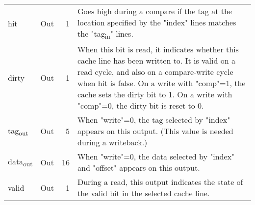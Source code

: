 \documentclass[11pt]{article}
\begin{document}
\begin{center}
\begin{tabular}{llrl}
hit & Out & 1 & Goes high during a compare if the tag at the location specified by the "index" lines matches the "tag\textsubscript{in}" lines.\\
dirty & Out & 1 & When this bit is read, it indicates whether this cache line has been written to. It is valid on a read cycle, and also on a compare-write cycle when hit is false. On a write with "comp"=1, the cache sets the dirty bit to 1. On a write with "comp"=0, the dirty bit is reset to 0.\\
tag\textsubscript{out} & Out & 5 & When "write"=0, the tag selected by "index" appears on this output. (This value is needed during a writeback.)\\
data\textsubscript{out} & Out & 16 & When "write"=0, the data selected by "index" and "offset" appears on this output.\\
valid & Out & 1 & During a read, this output indicates the state of the valid bit in the selected cache line.\\
\end{tabular}
\end{center}


\begin{center}

\end{center}
\section{}
\label{sec:org83f3102}
\end{document}
